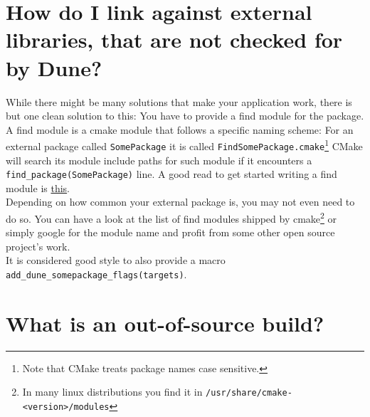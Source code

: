 \documentclass[a4paper,10pt]{scrartcl}
\begin{document}
\section{How do I link against external libraries, that are not checked for by Dune?}
\label{external}

While there might be many solutions that make your application work, there is but one clean solution to this: You have to provide a find module for the package. A find module is a cmake module that follows a specific naming scheme: For an external package called \lstinline!SomePackage! it is called \lstinline!FindSomePackage.cmake!\footnote{Note that CMake treats package names case sensitive.} CMake will search its module include paths for such module if it encounters a \lstinline!find_package(SomePackage)! line. A good read to get started writing a find module is \href{http://www.cmake.org/Wiki/CMake:How_To_Find_Libraries}{this}. \\

Depending on how common your external package is, you may not even need to do so. You can have a look at the list of find modules shipped by cmake\footnote{In many linux distributions you find it in \lstinline!/usr/share/cmake-<version>/modules!} or simply google for the module name and profit from some other open source project's work. \\

It is considered good style to also provide a macro \lstinline!add_dune_somepackage_flags(targets)!.

\section{What is an out-of-source build?}
\label{outofsource}
\end{document}

